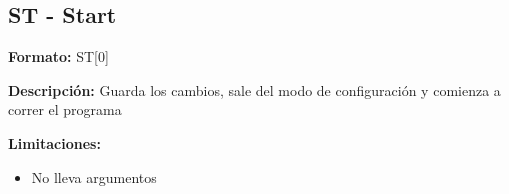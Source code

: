 
\subsection{ST - Start} %
\label{sub:st_start}


\textbf{Formato:} ST[0]

\textbf{Descripción:}
Guarda los cambios, sale del modo de configuración y comienza a correr el programa

\textbf{Limitaciones:}
\begin{itemize}
  \item No lleva argumentos
\end{itemize}

